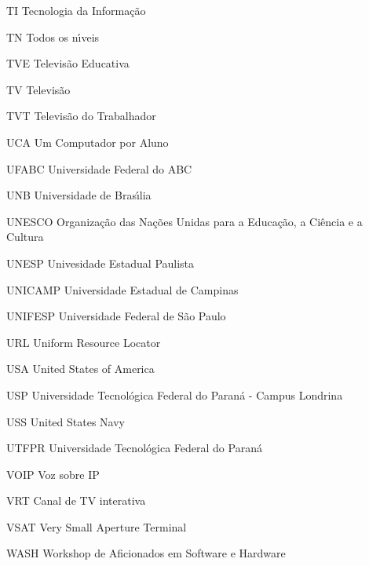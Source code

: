 \begin{siglas}
\item[TI] Tecnologia da Informa\c{c}\~ao
\item[TN] Todos os n\'{\i}veis
\item[TVE] Televis\~ao Educativa
\item[TV] Televis\~ao
\item[TVT] Televis\~ao do Trabalhador
\item[UCA] Um Computador por Aluno
\item[UFABC] Universidade Federal do ABC 
\item[UNB] Universidade de Bras\'{\i}lia
\item[UNESCO] Organiza\c{c}\~ao das Na\c{c}\~oes Unidas para a Educa\c{c}\~ao, a Ci\^encia e a Cultura  
\item[UNESP] Univesidade Estadual Paulista
\item[UNICAMP] Universidade Estadual de Campinas
\item[UNIFESP] Universidade Federal de S\~ao Paulo
\item[URL] Uniform Resource Locator
\item[USA] United States of America
\item[USP] Universidade Tecnol\'ogica Federal do Paran\'a - Campus Londrina
\item[USS] United States Navy
\item[UTFPR] Universidade Tecnol\'ogica Federal do Paran\'a
\item[VOIP] Voz sobre IP
\item[VRT] Canal de TV interativa
\item[VSAT] Very Small Aperture Terminal
\item[WASH] Workshop de Aficionados em Software e Hardware

\end{siglas}
